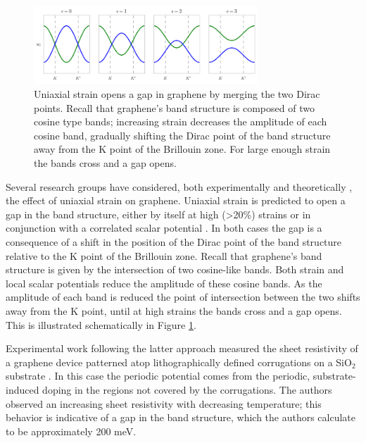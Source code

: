 \documentclass[edeposit,fullpage,draftthesis]{uiucthesis2009}
\begin{document}
            \begin{figure}
            \centering
            \includegraphics[width=0.75\textwidth]{images/background/strain_gap2.png}
            \caption[Gap opening in graphene via uniaxial strain]{
            Uniaxial strain opens a gap in graphene by merging the two Dirac points. Recall that
            graphene's band structure is composed of two cosine type bands;
            increasing strain decreases the amplitude of each cosine band, gradually shifting the Dirac
            point of the band structure away from the K point of the Brillouin zone. For large enough
            strain the bands cross and a gap opens.
            }
            \label{fig:strain_gap}
            \end{figure}
        
        Several research groups have considered, both experimentally \cite{Ni2008, Kim2009, Mohiuddin2009, 
        Zang2013} and theoretically \cite{Pereira2009, Low2011}, the effect of uniaxial 
        strain on graphene. Uniaxial strain is predicted to open a gap in the band structure, either by 
        itself at high (\textgreater 20\%) strains \cite{Pereira2009} or in conjunction with a correlated scalar 
        potential \cite{Low2011}. In both cases the gap is a consequence of a shift in the position of the Dirac
        point of the band structure relative to the K point of the Brillouin zone. Recall that graphene's
        band structure is given by the intersection of two cosine-like bands. 
        Both strain and local scalar potentials reduce the amplitude of these cosine bands.
        As the amplitude of each band is
        reduced the point of intersection between the two shifts away from the K point, until at high
        strains the bands cross and a gap opens. This is illustrated schematically in Figure \ref{fig:strain_gap}.
        
        Experimental work following the latter approach 
        measured the sheet resistivity of a graphene device patterned 
        atop lithographically defined corrugations on a SiO$_2$ substrate \cite{lee2013modification}.
        In this case the periodic potential comes from the periodic, 
        substrate-induced doping in the regions not covered by the corrugations. The authors
        observed an increasing sheet resistivity with decreasing temperature; this
        behavior is indicative of a gap in the band structure, which the authors calculate to be 
        approximately 200 meV. 
    
\end{document}
